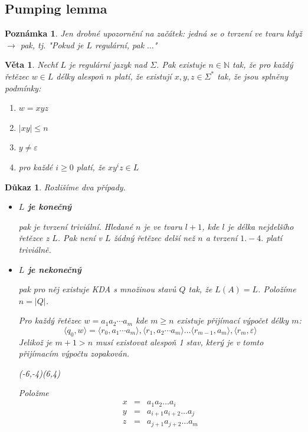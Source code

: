 \documentclass[10pt, a4paper, titlepage]{article}
\theoremstyle{note}
\newtheorem{dukaz}{Důkaz}
\newtheorem{veta}{Věta}
\newtheorem{poznamka}{Poznámka}
\begin{document}
\subsection{Pumping lemma}

\begin{poznamka}
Jen drobné upozornění na začátek: jedná se o tvrzení ve tvaru když $\rightarrow$ pak, tj. "Pokud je $L$ regulární, pak $\ldots$"
\end{poznamka}

\begin{veta}
Nechť $L$ je regulární jazyk nad $\Sigma$. Pak existuje $n \in \mathbb{N}$ tak, že pro každý řetězec $w \in L$ délky alespoň $n$ platí, že existují $x,y,z \in \Sigma^*$ tak, že jsou splněny podmínky:
\begin{enumerate}
\item
$w = xyz$
\item
$|xy| \le n$
\item
$y \neq \varepsilon$
\item
pro každé $i \ge 0$ platí, že $xy^iz \in L$
\end{enumerate}
\end{veta}

\begin{dukaz}
Rozlišíme dva případy.
\begin{itemize}
\item
\textbf{$L$ je konečný}
 
pak je tvrzení triviální. Hledané $n$ je ve tvaru $l+1$, kde $l$ je délka nejdelšího řetězce z $L$. Pak není v $L$ žádný řetězec delší než $n$ a tvrzení $1. - 4.$ platí triviálně.
 
\item
\textbf{$L$ je nekonečný} 

pak pro něj existuje KDA s množinou stavů $Q$ tak, že $L(A) = L$. Položíme $n=|Q|$.

Pro každý řetězec $w=a_1a_2\cdots a_m$ kde $m \ge n$ existuje přijímací výpočet
délky $m$:
$$
\langle q_0,w \rangle = \langle r_0, a_1\cdots a_m \rangle,\langle r_1, a_2\cdots a_m \rangle \ldots \langle r_{m-1}, a_m \rangle, \langle r_m, \varepsilon \rangle
$$
Jelikož je $m+1 > n$ musí existovat alespoň 1 stav, který je v tomto přijímacím výpočtu zopakován.

\begin{center}
\begin{VCPicture}{(-6,-4)(6,4)}


\end{VCPicture}
\end{center}
Položme
\begin{eqnarray*}
x &=& a_{1}a_{2}\ldots a_{i} \\
y &=& a_{i+1}a_{i+2}\ldots a_{j} \\
z &=& a_{j+1}a_{j+2}\ldots a_{m}
\end{eqnarray*}
\end{itemize}
\end{dukaz}
\end{document}
